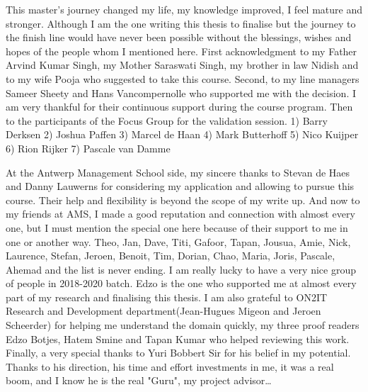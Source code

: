 \begin{acknowledgements}
This master's journey changed my life, my knowledge improved, I feel mature and stronger.
\bigbreak
Although I am the one writing this thesis to finalise but the journey to the finish line would have never been possible without the blessings, wishes and hopes of the people whom I mentioned here.
\bigbreak
First acknowledgment to my Father Arvind Kumar Singh, my Mother Saraswati Singh, my brother in law Nidish and to my wife Pooja who suggested to take this course.
\bigbreak
Second, to my line managers Sameer Sheety and Hans Vancompernolle who supported me with the decision. I am very thankful for their continuous support during the course program.
\bigbreak
Then to the participants of the Focus Group for the validation session.
1) Barry Derksen
2) Joshua Paffen
3) Marcel de Haan
4) Mark Butterhoff
5) Nico Kuijper
6) Rion Rijker 
7) Pascale van Damme

\bigbreak
At the Antwerp Management School side, my sincere thanks to Stevan de Haes and Danny Lauwerns for considering my application and allowing to pursue this course. Their help and flexibility is beyond the scope of my write up.
\bigbreak
And now to my friends at AMS, I made a good reputation and connection with almost every one, but I must mention the special one here because of their support to me in one or another way. Theo, Jan, Dave, Titi, Gafoor, Tapan, Jousua, Amie, Nick, Laurence, Stefan, Jeroen, Benoit, Tim, Dorian, Chao, Maria, Joris, Pascale, Ahemad and the list is never ending. I am really lucky to have a very nice group of people in 2018-2020 batch. Edzo is the one who supported me at almost every part of my research and finalising this thesis.
\bigbreak
I am also grateful to ON2IT Research and Development department(Jean-Hugues Migeon and Jeroen Scheerder) for helping me understand the domain quickly,  my three proof readers Edzo Botjes, Hatem Smine and Tapan Kumar who helped reviewing this work.
\bigbreak
Finally, a very special thanks to Yuri Bobbert Sir for his belief in my potential. Thanks to his direction, his time and effort investments in me, it was a real boom, and I know he is the real "Guru", my project advisor\ldots


\end{acknowledgements}

